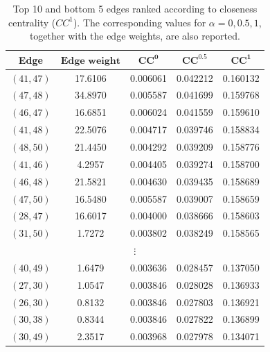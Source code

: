 \documentclass[12pt]{article}
\theoremstyle{normalhead_nobrackets}
\theoremstyle{exampstyle}
\begin{document}
\begin{table}[h!]
	\centering
	\setlength{\tabcolsep}{6pt}
	\renewcommand{\arraystretch}{1.10}
	\begin{tabular}{|c|c|c|c|c|}
		\hline
		\textbf{Edge} & $\textbf{Edge weight}$ & $\mathbf{CC^{0}}$ & $\mathbf{CC^{0.5}}$ & $\mathbf{CC^{1}}$ \\
		\hline
		
		$(41,47)$ & 17.6106 & 0.006061 & 0.042212 & 0.160132 \\
		\hline
		$(47,48)$ & 34.8970 & 0.005587 & 0.041699 & 0.159768 \\
		\hline
		$(46,47)$ & 16.6851 & 0.006024 & 0.041559 & 0.159610 \\
		\hline
		$(41,48)$ & 22.5076 & 0.004717 & 0.039746 & 0.158834 \\
		\hline
		$(48,50)$ & 21.4450 & 0.004292 & 0.039209 & 0.158776 \\
		\hline
		$(41,46)$ & 4.2957  & 0.004405 & 0.039274 & 0.158700 \\
		\hline
		$(46,48)$ & 21.5821 & 0.004630 & 0.039435 & 0.158689 \\
		\hline
		$(47,50)$ & 16.5480 & 0.005587 & 0.039007 & 0.158659 \\
		\hline
		$(28,47)$ & 16.6017 & 0.004000 & 0.038666 & 0.158603 \\
		\hline
		$(31,50)$ & 1.7272  & 0.003802 & 0.038249 & 0.158565 \\
		\hline
		
		\multicolumn{5}{|c|}{$\vdots$} \\
		\hline
		
		$(40,49)$ & 1.6479 & 0.003636 & 0.028457 & 0.137050 \\
		\hline
		$(27,30)$ & 1.0547 & 0.003846 & 0.028028 & 0.136933 \\
		\hline
		$(26,30)$ & 0.8132 & 0.003846 & 0.027803 & 0.136921 \\
		\hline
		$(30,38)$ & 0.8344 & 0.003846 & 0.027822 & 0.136899 \\
		\hline
		$(30,49)$ & 2.3517 & 0.003968 & 0.027978 & 0.134071 \\
		\hline
		
	\end{tabular}
	

	\caption{Top 10 and bottom 5 edges ranked according to closeness centrality ($CC^{1}$). The corresponding values for $\alpha = 0, 0.5, 1$, together with the edge weights, are also reported.}
	
\end{table}
\end{document}
